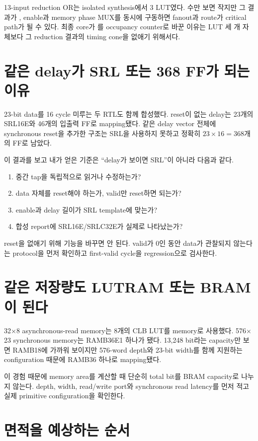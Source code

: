 13-input reduction OR는 isolated synthesis에서 3 LUT였다. 수만 보면 작지만
그 결과가 , enable과 memory phase MUX를 동시에 구동하면
fanout과 route가 critical path가 될 수 있다. 최종 core가
를 occupancy counter로 바꾼 이유는 LUT 세 개 자체보다
그 reduction 결과의 timing cone을 없애기 위해서다.

\section{같은 delay가 SRL 또는 368 FF가 되는 이유}

23-bit data를 16 cycle 미루는 두 RTL도 함께 합성했다. reset이 없는 delay는
23개의 SRL16E와 46개의 입출력 FF로 mapping됐다. 같은 delay vector 전체에
synchronous reset을 추가한 구조는 SRL을 사용하지 못하고 정확히
$23\times16=368$개의 FF로 남았다.

이 결과를 보고 내가 얻은 기준은 ``delay가 보이면 SRL''이 아니라 다음과 같다.

\begin{enumerate}
  \item 중간 tap을 독립적으로 읽거나 수정하는가?
  \item data 자체를 reset해야 하는가, valid만 reset하면 되는가?
  \item enable과 delay 길이가 SRL template에 맞는가?
  \item 합성 report에 SRL16E/SRLC32E가 실제로 나타났는가?
\end{enumerate}

reset을 없애기 위해 기능을 바꾸면 안 된다. valid가 0인 동안 data가 관찰되지
않는다는 protocol을 먼저 확인하고 first-valid cycle을 regression으로 검사한다.

\section{같은 저장량도 LUTRAM 또는 BRAM이 된다}

32$\times$8 asynchronous-read memory는 8개의 CLB LUT를 memory로 사용했다.
576$\times$23 synchronous memory는 RAMB36E1 하나가 됐다. 13,248 bit라는
capacity만 보면 RAMB18에 가까워 보이지만 576-word depth와 23-bit width를 함께
지원하는 configuration 때문에 RAMB36 하나로 mapping됐다.

이 경험 때문에 memory area를 계산할 때 단순히 total bit를 BRAM capacity로
나누지 않는다. depth, width, read/write port와 synchronous read latency를 먼저
적고 실제 primitive configuration을 확인한다.

\section{면적을 예상하는 순서}

